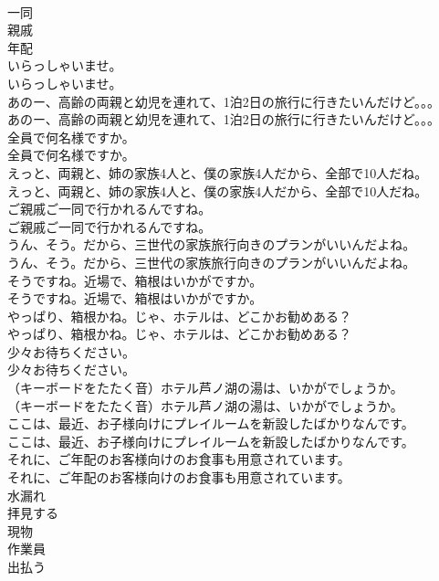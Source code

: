 \documentclass[8pt]{extreport}
\begin{document}
\begin{CJK}{UTF8}{min}
\\	一同
\\	親戚
\\	年配
\\	いらっしゃいませ。	
\\	いらっしゃいませ。　 
\\	あのー、高齢の両親と幼児を連れて、1泊2日の旅行に行きたいんだけど。。。	
\\	あのー、高齢の両親と幼児を連れて、1泊2日の旅行に行きたいんだけど。。。 
\\	全員で何名様ですか。	
\\	全員で何名様ですか。 
\\	えっと、両親と、姉の家族4人と、僕の家族4人だから、全部で10人だね。	
\\	えっと、両親と、姉の家族4人と、僕の家族4人だから、全部で10人だね。 
\\	ご親戚ご一同で行かれるんですね。	
\\	ご親戚ご一同で行かれるんですね。 
\\	うん、そう。だから、三世代の家族旅行向きのプランがいいんだよね。	
\\	うん、そう。だから、三世代の家族旅行向きのプランがいいんだよね。 
\\	そうですね。近場で、箱根はいかがですか。	
\\	そうですね。近場で、箱根はいかがですか。 
\\	やっぱり、箱根かね。じゃ、ホテルは、どこかお勧めある？	
\\	やっぱり、箱根かね。じゃ、ホテルは、どこかお勧めある？ 
\\	少々お待ちください。	
\\	少々お待ちください。 
\\	（キーボードをたたく音）ホテル芦ノ湖の湯は、いかがでしょうか。	
\\	（キーボードをたたく音）ホテル芦ノ湖の湯は、いかがでしょうか。 
\\	ここは、最近、お子様向けにプレイルームを新設したばかりなんです。	
\\	ここは、最近、お子様向けにプレイルームを新設したばかりなんです。 
\\	それに、ご年配のお客様向けのお食事も用意されています。	
\\	それに、ご年配のお客様向けのお食事も用意されています。 
\\	水漏れ
\\	拝見する
\\	現物
\\	作業員
\\	出払う

\end{CJK}
\end{document}
